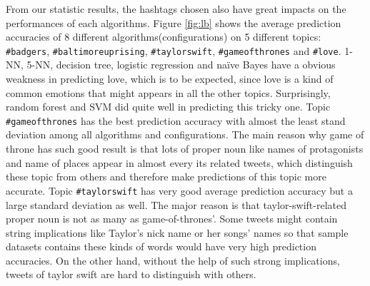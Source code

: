 \documentclass[letterpaper,11pt,twocolumn]{article}
\begin{document}
\begin{figure*}[!htb]
\centering
{}
\caption{Prediction Accuracies on 5 Different Labels}
\label{fig:lb}
\end{figure*}

From our statistic results, the hashtags chosen also have great impacts on the performances of each algorithms. Figure \ref{fig:lb} shows the average prediction accuracies of 8 different algorithms(configurations) on 5 different topics: \texttt{\#badgers}, \texttt{\#baltimoreuprising}, \texttt{\#taylorswift}, \texttt{\#gameofthrones} and \texttt{\#love}. 1-NN, 5-NN, decision tree, logistic regression and na{\"i}ve Bayes have a obvious weakness in predicting love, which is to be expected, since love is a kind of common emotions that might appears in all the other topics. Surprisingly, random forest and SVM did quite well in predicting this tricky one. Topic \texttt{\#gameofthrones} has the best prediction accuracy with almost the least stand deviation among all algorithms and configurations. The main reason why game of throne has such good result is that lots of proper noun like names of protagonists and name of places appear in almost every its related tweets, which distinguish these topic from others and therefore make predictions of this topic more accurate. Topic \texttt{\#taylorswift} has very good average prediction accuracy but a large standard deviation as well. The major reason is that taylor-swift-related proper noun is not as many as game-of-thrones'. Some tweets might contain string implications like Taylor's nick name or her songs' names so that sample datasets contains these kinds of words would have very high prediction accuracies. On the other hand, without the help of such strong implications, tweets of taylor swift are hard to distinguish with others.
\end{document}
